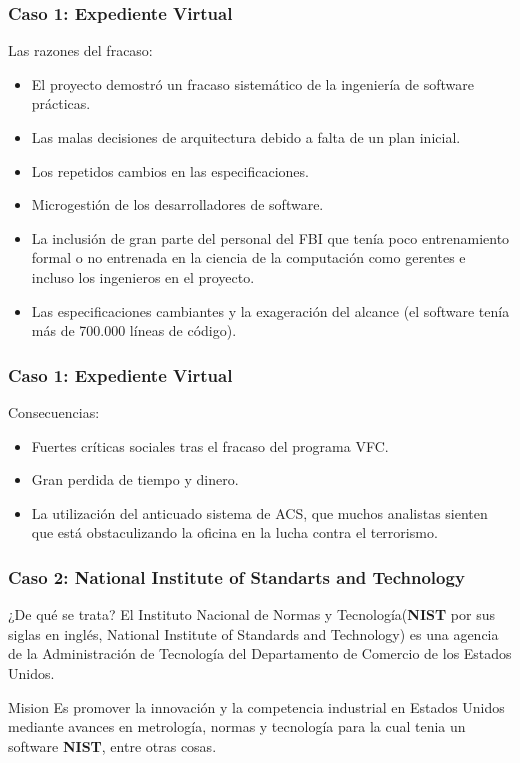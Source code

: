 \documentclass[11pt]{beamer}
\begin{document}
	\begin{frame}
		\frametitle{Caso 1: Expediente Virtual}
		\begin{block}{Las razones del fracaso:}
			\begin{itemize}
				\item El proyecto demostró un fracaso sistemático de la ingeniería de software prácticas.
				\pause
				\item Las malas decisiones de arquitectura debido a falta de un plan inicial.
				\pause
				\item Los repetidos cambios en las especificaciones.
				\pause
				\item Microgestión de los desarrolladores de software.
				\pause
				\item La inclusión de gran parte del personal del FBI que tenía poco entrenamiento formal o no entrenada en la ciencia de la computación como gerentes e incluso los ingenieros en el proyecto.
				\pause
				\item Las especificaciones cambiantes y la exageración del alcance (el software tenía más de 700.000 líneas de código).
			\end{itemize}
		\end{block}
	\end{frame}

	\begin{frame}
		\frametitle{Caso 1: Expediente Virtual}
		\begin{block}{Consecuencias:}
			\begin{itemize}
				\item Fuertes críticas sociales tras el fracaso del programa VFC.
				\pause
				\item Gran perdida de tiempo y dinero.
				\pause
				\item La utilización del anticuado sistema de ACS, que muchos analistas sienten que está obstaculizando la oficina en la lucha contra el terrorismo.
			\end{itemize}
		\end{block}
	\end{frame}

	\begin{frame}
		\frametitle{Caso 2: National Institute of Standarts and Technology}
		\begin{block}{¿De qué se trata?}
			El Instituto Nacional de Normas y Tecnología(\textbf{NIST} por sus siglas en inglés, National Institute of Standards and Technology) es una agencia de la Administración de Tecnología del Departamento de Comercio de los Estados Unidos.
		\end{block}
	    \pause
	    \begin{block}{Mision}
	    	Es promover la innovación y la competencia industrial en Estados Unidos mediante avances en metrología, normas y tecnología para la cual tenia un software \textbf{NIST}, entre otras cosas.
	    \end{block}
	\end{frame}
\end{document}

